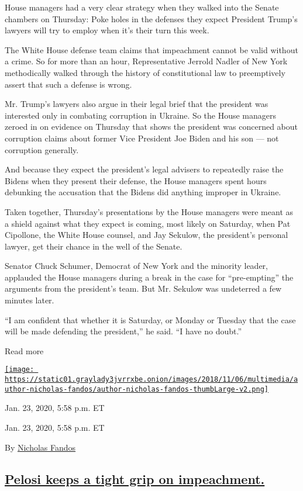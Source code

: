 House managers had a very clear strategy when they walked into the
Senate chambers on Thursday: Poke holes in the defenses they expect
President Trump's lawyers will try to employ when it's their turn this
week.

The White House defense team claims that impeachment cannot be valid
without a crime. So for more than an hour, Representative Jerrold Nadler
of New York methodically walked through the history of constitutional
law to preemptively assert that such a defense is wrong.

Mr. Trump's lawyers also argue in their legal brief that the president
was interested only in combating corruption in Ukraine. So the House
managers zeroed in on evidence on Thursday that shows the president was
concerned about corruption claims about former Vice President Joe Biden
and his son --- not corruption generally.

And because they expect the president's legal advisers to repeatedly
raise the Bidens when they present their defense, the House managers
spent hours debunking the accusation that the Bidens did anything
improper in Ukraine.

Taken together, Thursday's presentations by the House managers were
meant as a shield against what they expect is coming, most likely on
Saturday, when Pat Cipollone, the White House counsel, and Jay Sekulow,
the president's personal lawyer, get their chance in the well of the
Senate.

Senator Chuck Schumer, Democrat of New York and the minority leader,
applauded the House managers during a break in the case for
``pre-empting'' the arguments from the president's team. But Mr. Sekulow
was undeterred a few minutes later.

``I am confident that whether it is Saturday, or Monday or Tuesday that
the case will be made defending the president,'' he said. ``I have no
doubt.''

Read more

\href{https://www.nytimes3xbfgragh.onion/by/nicholas-fandos}{\texttt{[image: https://static01.graylady3jvrrxbe.onion/images/2018/11/06/multimedia/author-nicholas-fandos/author-nicholas-fandos-thumbLarge-v2.png]}}

Jan. 23, 2020, 5:58 p.m. ET

Jan. 23, 2020, 5:58 p.m. ET

By \href{https://www.nytimes3xbfgragh.onion/by/nicholas-fandos}{Nicholas
Fandos}

\hypertarget{pelosi-keeps-a-tight-grip-on-impeachment}{%
\subsection{\texorpdfstring{\protect\hyperlink{pelosi-impeachment}{Pelosi
keeps a tight grip on
impeachment.}}{Pelosi keeps a tight grip on impeachment.}}\label{pelosi-keeps-a-tight-grip-on-impeachment}}

